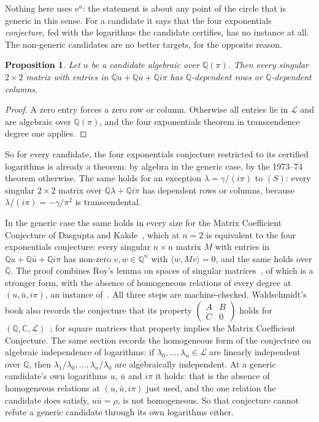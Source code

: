 \documentclass[11pt,a4paper]{article}
\theoremstyle{plain}
\newtheorem{proposition}[theorem]{Proposition}
\theoremstyle{definition}
\newcommand{\C}{\mathbb{C}}
\newcommand{\e}{\mathrm{e}}
\newcommand{\Q}{\mathbb{Q}}
\newcommand{\Alg}{\overline{\mathbb{Q}}}
\newcommand{\Logs}{\mathcal{L}}
\begin{document}
Nothing here uses $\e^{u}$: the statement is about any point of the circle that is generic in this
sense. For a candidate it says that the four exponentials \emph{conjecture}, fed with the
logarithms the candidate certifies, has no instance at all. The non-generic candidates are no
better targets, for the opposite reason.

\begin{proposition}\label{prop:homog-nongeneric}
Let $u$ be a candidate algebraic over $\Q(\pi)$. Then every singular $2\times2$ matrix with entries
in $\Q u+\Q\bar u+\Q i\pi$ has $\Q$-dependent rows or $\Q$-dependent columns.
\end{proposition}

\begin{proof}
A zero entry forces a zero row or column. Otherwise all entries lie in $\Logs$ and are algebraic
over $\Q(\pi)$, and the four exponentials theorem in transcendence degree one applies.
\end{proof}

So for every candidate, the four exponentials conjecture restricted to its certified logarithms is
already a theorem: by algebra in the generic case, by the 1973--74 theorem otherwise. The same holds
for an exception $\lambda=\gamma/(i\pi)$ to $(S)$: every singular $2\times2$ matrix over
$\Q\lambda+\Q i\pi$ has dependent rows or columns, because $\lambda/(i\pi)=-\gamma/\pi^{2}$ is
transcendental.

In the generic case the same holds in every size for the Matrix Coefficient Conjecture of Dasgupta and
Kakde~\cite[Conjectures~1.2 and~2.3]{dasgupta-kakde}, which at $n=2$ is equivalent to the four
exponentials conjecture: every singular $n\times n$ matrix $M$ with entries in $\Q u+\Q\bar u+\Q i\pi$
has non-zero $v,w\in\Q^{n}$ with $\langle w,Mv\rangle=0$, and the same holds over $\Alg$. The proof
combines Roy's lemma on spaces of singular matrices~\cite[Theorem~2.2]{dasgupta-kakde}, of which
\cite[Proposition~12.5]{waldschmidt-book} is a stronger form, with the absence of homogeneous
relations of every degree at $(u,\bar u,i\pi)$, an instance of~\cite[Proposition~12.13]{waldschmidt-book}.
All three steps are machine-checked. Waldschmidt's book also records the conjecture that its property
$\left(\begin{smallmatrix}A&B\\C&0\end{smallmatrix}\right)$ holds for
$(\Q,\C,\Logs)$~\cite[\S12.4.1]{waldschmidt-book}; for square matrices that property implies the
Matrix Coefficient Conjecture. The same section records the homogeneous form of the conjecture on
algebraic independence of logarithms: if $\lambda_{0},\dots,\lambda_{n}\in\Logs$ are linearly
independent over $\Q$, then $\lambda_{1}/\lambda_{0},\dots,\lambda_{n}/\lambda_{0}$ are algebraically
independent. At a generic candidate's own logarithms $u$, $\bar u$ and $i\pi$ it holds: that is
the absence of homogeneous relations at $(u,\bar u,i\pi)$ just used, and the one relation the
candidate does satisfy, $u\bar u=\rho$, is not homogeneous. So that conjecture cannot refute a
generic candidate through its own logarithms either.
\end{document}

